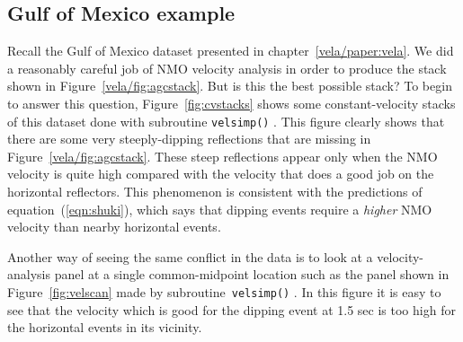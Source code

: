 \subsection{Gulf of Mexico example}
\par
Recall the Gulf of Mexico dataset presented in chapter~\ref{vela/paper:vela}.
We did a reasonably careful job of NMO velocity analysis
in order to produce the stack shown in Figure~\ref{vela/fig:agcstack}.
But is this the best possible stack?
To begin to answer this question, Figure~\ref{fig:cvstacks} shows
some constant-velocity stacks of this dataset done with subroutine
\texttt{velsimp()} .
This figure clearly shows that
there are some very steeply-dipping reflections
that are missing in Figure~\ref{vela/fig:agcstack}.
These steep reflections appear only when the NMO velocity
is quite high compared with the velocity
that does a good job on the horizontal reflectors.
This phenomenon is consistent with 
the predictions of equation~(\ref{eqn:shuki}),
which says that dipping events 
require a {\em higher} NMO velocity than nearby horizontal events.
%
\par
Another way of seeing the same conflict in the data
is to look at a velocity-analysis panel
at a single common-midpoint location
such as the panel shown in Figure~\ref{fig:velscan}
made by subroutine~\texttt{velsimp()} .
In this figure it is easy to see that the velocity
which is good for the dipping event at 1.5 sec is too high
for the horizontal events in its vicinity.
%

